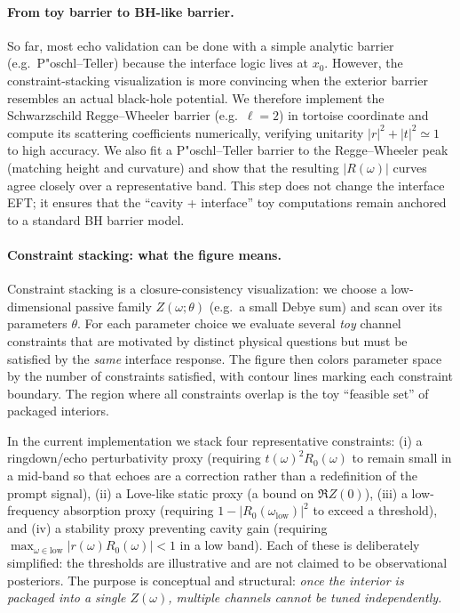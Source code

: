 \paragraph{From toy barrier to BH-like barrier.}
So far, most echo validation can be done with a simple analytic barrier (e.g.\ P"oschl--Teller) because the interface logic lives at $x_0$. However, the constraint-stacking visualization is more convincing when the exterior barrier resembles an actual black-hole potential. We therefore implement the Schwarzschild Regge--Wheeler barrier (e.g.\ $\ell=2$) in tortoise coordinate and compute its scattering coefficients numerically, verifying unitarity $|r|^2+|t|^2\simeq 1$ to high accuracy. We also fit a P"oschl--Teller barrier to the Regge--Wheeler peak (matching height and curvature) and show that the resulting $|R(\omega)|$ curves agree closely over a representative band. This step does not change the interface EFT; it ensures that the ``cavity + interface'' toy computations remain anchored to a standard BH barrier model.

\paragraph{Constraint stacking: what the figure means.}
Constraint stacking is a closure-consistency visualization: we choose a low-dimensional passive family $Z(\omega;\theta)$ (e.g.\ a small Debye sum) and scan over its parameters $\theta$. For each parameter choice we evaluate several \emph{toy} channel constraints that are motivated by distinct physical questions but must be satisfied by the \emph{same} interface response. The figure then colors parameter space by the number of constraints satisfied, with contour lines marking each constraint boundary. The region where all constraints overlap is the toy ``feasible set'' of packaged interiors.

In the current implementation we stack four representative constraints:
(i) a ringdown/echo perturbativity proxy (requiring $t(\omega)^2R_0(\omega)$ to remain small in a mid-band so that echoes are a correction rather than a redefinition of the prompt signal),
(ii) a Love-like static proxy (a bound on $\Re Z(0)$),
(iii) a low-frequency absorption proxy (requiring $1-|R_0(\omega_{\mathrm{low}})|^2$ to exceed a threshold),
and (iv) a stability proxy preventing cavity gain (requiring $\max_{\omega\in\mathrm{low}}|r(\omega)R_0(\omega)|<1$ in a low band).
Each of these is deliberately simplified: the thresholds are illustrative and are not claimed to be observational posteriors. The purpose is conceptual and structural: \emph{once the interior is packaged into a single $Z(\omega)$, multiple channels cannot be tuned independently.}

